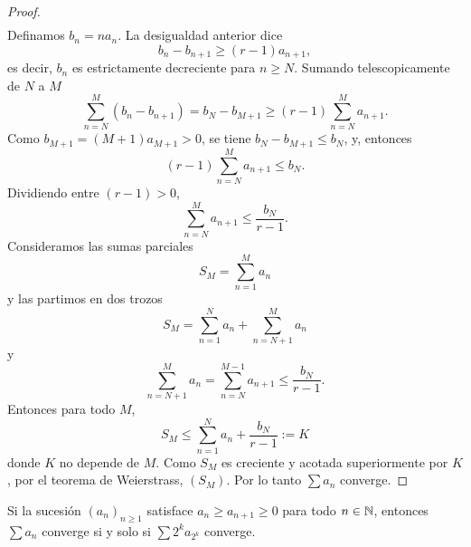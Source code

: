 \documentclass[12pt,a4paper]{article}
\begin{document}
\begin{proof}
\begin{align*}
        \end{align*}
        Definamos $b_{n}=na_{n}$. La desigualdad anterior dice
        \begin{equation*}
            b_{n}-b_{n+1}\geq(r-1)a_{n+1},
        \end{equation*}
        es decir, $b_{n}$ es estrictamente decreciente para $n\geq N$.
        Sumando telescopicamente de $N$ a $M$
        \begin{equation*}
            \sum_{n=N}^{M}(b_{n}-b_{n+1})=b_{N}-b_{M+1}\geq(r-1)\sum_{n=N}^{M}a_{n+1}.
        \end{equation*}
        Como $b_{M+1}=(M+1)a_{M+1}\gt0$, se tiene $b_{N}-b_{M+1}\leq b_{N}$,
        y, entonces
        \begin{equation*}
            (r-1)\sum_{n=N}^{M}a_{n+1}\leq b_{N}.
        \end{equation*}
        Dividiendo entre $(r-1)\gt0$,
        \begin{equation*}
            \sum_{n=N}^{M}a_{n+1}\leq\frac{b_{N}}{r-1}.
        \end{equation*}
        Consideramos las sumas parciales
        \begin{equation*}
            S_{M}=\sum_{n=1}^{M}a_{n}
        \end{equation*}
        y las partimos en dos trozos
        \begin{equation*}
            S_{M}=\sum_{n=1}^{N}a_{n}+\sum_{n=N+1}^{M}a_{n}
        \end{equation*}
        y
        \begin{equation*}
            \sum_{n=N+1}^{M}a_{n}=\sum_{n=N}^{M-1}a_{n+1}\leq\frac{b_{N}}{r-1}.
        \end{equation*}
        Entonces para todo $M$,
        \begin{equation*}
            S_{M}\leq\sum_{n=1}^{N}a_{n}+\frac{b_{N}}{r-1}:=K
        \end{equation*}
        donde $K$ no depende de $M$. Como $S_{M}$ es creciente y acotada
        superiormente por $K$, por el teorema de Weierstrass, $(S_{M})$. Por lo tanto
        $\sum a_{n}$ converge.
    \end{proof}

    \begin{ejercicio}
        Si la sucesión $(a_{n})_{n\geq1}$ satisface $a_{n}\geq a_{n+1}\geq0$
        para todo $n\in\mathbb{N}$, entonces $\sum a_{n}$ converge si y solo si $\sum2^{k}a_{2^{k}}$
        converge.
    \end{ejercicio}
\end{document}

